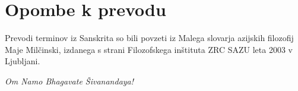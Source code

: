 
\vspace{5mm}



%
%        






\section*{Opombe k prevodu}
Prevodi terminov iz Sanskrita so bili povzeti iz Malega slovarja azijskih filozofij Maje Milčinski, izdanega s strani Filozofskega inštituta ZRC SAZU leta 2003 v Ljubljani.

\emph{Om Namo Bhagavate Šivanandaya!}




